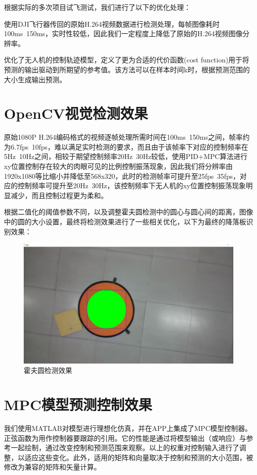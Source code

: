 根据实际的多次项目试飞测试，我们进行了以下的优化处理：

使用DJI飞行器传回的原始H.264视频数据进行检测处理，每帧图像耗时100ms~150ms，实时性较低，因此我们一定程度上降低了原始的H.264视频图像分辨率。

优化了无人机的控制轨迹模型，定义了更为合适的代价函数(cost function)用于将预测的输出驱动到所期望的参考值。该方法可以在样本时间k时，根据预测范围的大小生成输出预测。

\section{OpenCV视觉检测效果}

原始1080P H.264编码格式的视频逐帧处理所需时间在100ms~150ms之间，帧率约为6.7fps~10fps，难以满足实时检测的要求，而且由于该帧率下对应的控制频率在5Hz~10Hz之间，相较于期望控制频率20Hz~30Hz较低，使用PID+MPC算法进行xy位置控制存在较大的肉眼可见的比例控制振荡现象，因此我们将分辨率由1920x1080等比缩小并降低至568x320，此时的检测帧率可提升至25fps~35fps，对应的控制频率可提升至20Hz~30Hz，该控制频率下无人机的xy位置控制振荡现象明显减少，而且控制过程更为柔和。

根据二值化的阈值参数不同，以及调整霍夫圆检测中的圆心与圆心间的距离，图像中的圆的大小设置，最终将检测效果进行了一些相关优化，以下为最终的降落板识别效果：

\begin{figure}[ht]
  \centering
  \includegraphics[width=0.8\linewidth]{./Figure/Hough_Circle_Detection.png}
  \caption{霍夫圆检测效果}\label{Fig:img16}
\end{figure}

\section{MPC模型预测控制效果}

我们使用MATLAB对模型进行理想化仿真，并在APP上集成了MPC模型控制器。正弦函数为用作控制器要跟踪的引用。它的性能是通过将模型输出（或响应）与参考一起绘制，通过改变控制和预测范围来观察。以上的权重对控制输入进行了调整，以适应这些变化。此外，适用的矩阵和向量取决于控制和预测的大小范围，被修改为兼容的矩阵和矢量计算。

